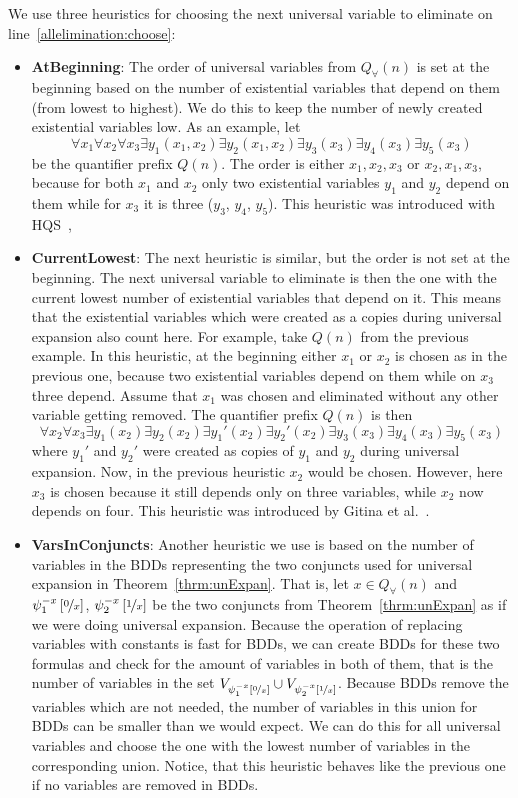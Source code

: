 \documentclass[
  digital, %
  color,
  twoside, %
  table,   %
  nolof,     %
  nolot,     %
]{fithesis3}
\theoremstyle{definition}
\theoremstyle{remark}
\newcommand{\substitute}[2]{\left[ \nicefrac{#2}{#1} \right]}
\newcommand{\vars}[1]{V_{#1}}
\newcommand{\prefix}[1]{Q({#1})}
\newcommand{\uprefix}[1]{Q_{\forall}(#1)}
\newcommand{\QUatbeginning}{\textbf{At\-Be\-gin\-ning}}
\newcommand{\QUcurrentlowest}{\textbf{CurrentLowest}}
\newcommand{\QUvarsinconjuncts}{\textbf{VarsInConjuncts}}
\begin{document}
We use three heuristics for choosing the next universal variable to eliminate on line~\ref{allelimination:choose}:
\begin{itemize}
    \item \QUatbeginning{}: The order of universal variables from $\uprefix{n}$ is set at the beginning based on the number of existential variables that depend on them (from lowest to highest). We do this to keep the number of newly created existential variables low. %
    As an example, let
    \[\forall x_1 \forall x_2 \forall x_3 \exists y_1(x_1, x_2) \exists y_2(x_1,x_2) \exists y_3(x_3) \exists y_4(x_3) \exists y_5 (x_3)\]
    be the quantifier prefix $\prefix{n}$. The order is either $x_1, x_2, x_3$ or $x_2, x_1, x_3$, because for both $x_1$ and $x_2$ only two existential variables $y_1$ and $y_2$ depend on them while for $x_3$ it is three ($y_3$, $y_4$, $y_5$). This heuristic was introduced with HQS~\cite{HQSquantifierElimination}, 
    \item \QUcurrentlowest{}: The next heuristic is similar, but the order is not set at the beginning. The next universal variable to eliminate is then the one with the current lowest number of existential variables that depend on it. This means that the existential variables which were created as a copies during universal expansion also count here. For example, take $\prefix{n}$ from the previous example. In this heuristic, at the beginning either $x_1$ or $x_2$ is chosen as in the previous one, because two existential variables depend on them while on $x_3$ three depend. Assume that $x_1$ was chosen and eliminated without any other variable getting removed. The quantifier prefix $\prefix{n}$ is then
    \[\forall x_2 \forall x_3 \exists y_1(x_2) \exists y_2(x_2) \exists y_1'(x_2) \exists y_2'(x_2) \exists y_3(x_3) \exists y_4(x_3) \exists y_5 (x_3)\]
    where $y_1'$ and $y_2'$ were created as copies of $y_1$ and $y_2$ during universal expansion. Now, in the previous heuristic $x_2$ would be chosen. However, here $x_3$ is chosen because it still depends only on three variables, while $x_2$ now depends on four. This heuristic was introduced by Gitina et al.~\cite{HQSsimpleAlg}.
    \item \QUvarsinconjuncts{}: Another heuristic we use is based on the number of variables in the BDDs representing the two conjuncts used for universal expansion in Theorem~\ref{thrm:unExpan}. That is, let $x \in \uprefix{n}$ and $\psi_1^{-x}\substitute{x}{0}$, $\psi_2^{-x}\substitute{x}{1}$
    be the two conjuncts from Theorem~\ref{thrm:unExpan} as if we were doing universal expansion. Because the operation of replacing variables with constants is fast for BDDs, we can create BDDs for these two formulas and check for the amount of variables in both of them, that is the number of variables in the set $\vars{\psi_1^{-x}\substitute{x}{0}} \cup \vars{\psi_2^{-x}\substitute{x}{1}}$. Because BDDs remove the variables which are not needed, the number of variables in this union for BDDs can be smaller than we would expect. We can do this for all universal variables and choose the one with the lowest number of variables in the corresponding union. Notice, that this heuristic behaves like the previous one if no variables are removed in BDDs.

\end{itemize}
\end{document}
